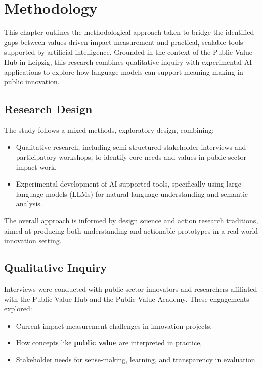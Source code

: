 \usepackage{biblatex}\chapter{Methodology}\label{ch:methodology}

This chapter outlines the methodological approach taken to bridge the identified gaps between values-driven impact measurement and practical, scalable tools supported by artificial intelligence.
Grounded in the context of the Public Value Hub in Leipzig, this research combines qualitative inquiry with experimental AI applications to explore how language models can support meaning-making in public innovation.

\section{Research Design}\label{sec:research-design}

The study follows a mixed-methods, exploratory design, combining:

\begin{itemize}
    \item Qualitative research, including semi-structured stakeholder interviews and participatory workshops, to identify core needs and values in public sector impact work.
    \item Experimental development of AI-supported tools, specifically using large language models (LLMs) for natural language understanding and semantic analysis.
\end{itemize}

The overall approach is informed by design science and action research traditions, aimed at producing both understanding and actionable prototypes in a real-world innovation setting.

\section{Qualitative Inquiry}\label{sec:qualitative-inquiry}

Interviews were conducted with public sector innovators and researchers affiliated with the Public Value Hub and the Public Value Academy.
These engagements explored:

\begin{itemize}
    \item Current impact measurement challenges in innovation projects,
    \item How concepts like \textbf{public value} are interpreted in practice,
    \item Stakeholder needs for sense-making, learning, and transparency in evaluation.
\end{itemize}


